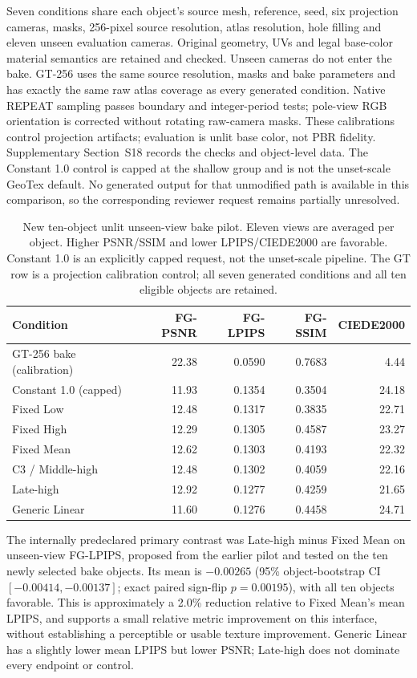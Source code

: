 \documentclass[times,twocolumn,final]{elsarticle}
\begin{document}
Seven conditions share each object's source mesh, reference, seed, six projection cameras, masks, 256-pixel source resolution, atlas resolution, hole filling and eleven unseen evaluation cameras. Original geometry, UVs and legal base-color material semantics are retained and checked. Unseen cameras do not enter the bake. GT-256 uses the same source resolution, masks and bake parameters and has exactly the same raw atlas coverage as every generated condition. Native REPEAT sampling passes boundary and integer-period tests; pole-view RGB orientation is corrected without rotating raw-camera masks. These calibrations control projection artifacts; evaluation is unlit base color, not PBR fidelity. Supplementary Section~S18 records the checks and object-level data. The Constant 1.0 control is capped at the shallow group and is not the unset-scale GeoTex default. No generated output for that unmodified path is available in this comparison, so the corresponding reviewer request remains partially unresolved.

\begin{table}[ht]
\centering\scriptsize
\caption{New ten-object unlit unseen-view bake pilot. Eleven views are averaged per object. Higher PSNR/SSIM and lower LPIPS/CIEDE2000 are favorable. Constant 1.0 is an explicitly capped request, not the unset-scale pipeline. The GT row is a projection calibration control; all seven generated conditions and all ten eligible objects are retained.}
\label{tab:new-bake}
\begin{tabular}{lrrrr}
\toprule Condition & FG-PSNR & FG-LPIPS & FG-SSIM & CIEDE2000 \\
\midrule
GT-256 bake (calibration) & 22.38 & 0.0590 & 0.7683 & 4.44 \\
Constant 1.0 (capped) & 11.93 & 0.1354 & 0.3504 & 24.18 \\
Fixed Low & 12.48 & 0.1317 & 0.3835 & 22.71 \\
Fixed High & 12.29 & 0.1305 & 0.4587 & 23.27 \\
Fixed Mean & 12.62 & 0.1303 & 0.4193 & 22.32 \\
C3 / Middle-high & 12.48 & 0.1302 & 0.4059 & 22.16 \\
Late-high & 12.92 & 0.1277 & 0.4259 & 21.65 \\
Generic Linear & 11.60 & 0.1276 & 0.4458 & 24.71 \\
\bottomrule\end{tabular}
\end{table}

The internally predeclared primary contrast was Late-high minus Fixed Mean on unseen-view FG-LPIPS, proposed from the earlier pilot and tested on the ten newly selected bake objects. Its mean is $-0.00265$ (95\% object-bootstrap CI $[-0.00414,-0.00137]$; exact paired sign-flip $p=0.00195$), with all ten objects favorable. This is approximately a 2.0\% reduction relative to Fixed Mean's mean LPIPS, and supports a small relative metric improvement on this interface, without establishing a perceptible or usable texture improvement. Generic Linear has a slightly lower mean LPIPS but lower PSNR; Late-high does not dominate every endpoint or control.
\end{document}
